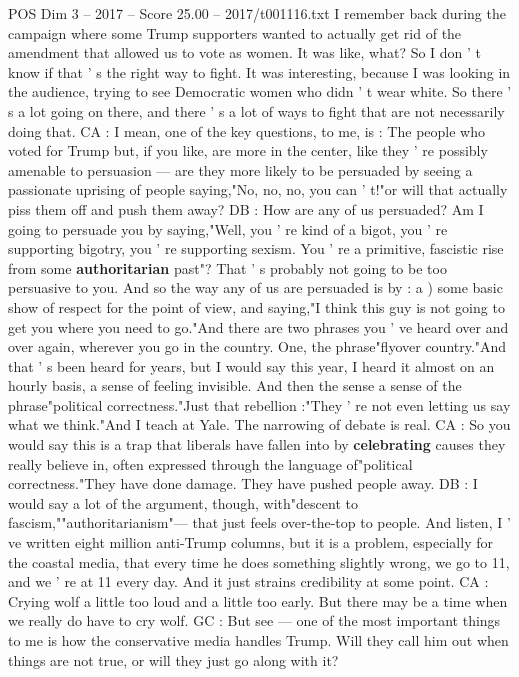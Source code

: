 \begin{textsample}{POS Dim 3 – 2017 – Score 25.00 – 2017/t001116.txt}
I remember back during the campaign where some Trump supporters wanted to actually get rid of the amendment that allowed us to vote as women.
It was like, what?
So I don ' t know if that ' s the right way to fight.
It was interesting, because I was looking in the audience, trying to see Democratic women who didn ' t wear white.
So there ' s a lot going on there, and there ' s a lot of ways to fight that are not necessarily doing that.
CA : I mean, one of the key questions, to me, is : The people who voted for Trump but, if you like, are more in the center, like they ' re possibly amenable to persuasion — are they more likely to be persuaded by seeing a passionate uprising of people saying,"No, no, no, you can ' t!"or will that actually piss them off and push them away?
DB : How are any of us persuaded?
Am I going to persuade you by saying,"Well, you ' re kind of a bigot, you ' re supporting bigotry, you ' re supporting sexism.
You ' re a primitive, fascistic rise from some \textbf{authoritarian} past"?
That ' s probably not going to be too persuasive to you.
And so the way any of us are persuaded is by : a ) some basic show of respect for the point of view, and saying,"I think this guy is not going to get you where you need to go."And there are two phrases you ' ve heard over and over again, wherever you go in the country.
One, the phrase"flyover country."And that ' s been heard for years, but I would say this year, I heard it almost on an hourly basis, a sense of feeling invisible.
And then the sense a sense of the phrase"political correctness."Just that rebellion :"They ' re not even letting us say what we think."And I teach at Yale.
The narrowing of debate is real.
CA : So you would say this is a trap that liberals have fallen into by \textbf{celebrating} causes they really believe in, often expressed through the language of"political correctness."They have done damage.
They have pushed people away.
DB : I would say a lot of the argument, though, with"descent to fascism,""authoritarianism"— that just feels over-the-top to people.
And listen, I ' ve written eight million anti-Trump columns, but it is a problem, especially for the coastal media, that every time he does something slightly wrong, we go to 11, and we ' re at 11 every day.
And it just strains credibility at some point.
CA : Crying wolf a little too loud and a little too early.
But there may be a time when we really do have to cry wolf.
GC : But see — one of the most important things to me is how the conservative media handles Trump.
Will they call him out when things are not true, or will they just go along with it?

\end{textsample}
